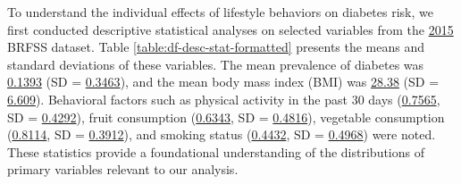 \documentclass[11pt]{article}
\begin{document}
To understand the individual effects of lifestyle behaviors on diabetes risk, we first conducted descriptive statistical analyses on selected variables from the \hyperlink{S0a}{2015} BRFSS dataset. Table \ref{table:df-desc-stat-formatted} presents the means and standard deviations of these variables. The mean prevalence of diabetes was \hyperlink{A0a}{0.1393} (SD = \hyperlink{A0b}{0.3463}), and the mean body mass index (BMI) was \hyperlink{A4a}{28.38} (SD = \hyperlink{A4b}{6.609}). Behavioral factors such as physical activity in the past 30 days (\hyperlink{A8a}{0.7565}, SD = \hyperlink{A8b}{0.4292}), fruit consumption (\hyperlink{A9a}{0.6343}, SD = \hyperlink{A9b}{0.4816}), vegetable consumption (\hyperlink{A10a}{0.8114}, SD = \hyperlink{A10b}{0.3912}), and smoking status (\hyperlink{A5a}{0.4432}, SD = \hyperlink{A5b}{0.4968}) were noted. These statistics provide a foundational understanding of the distributions of primary variables relevant to our analysis.

\end{document}
